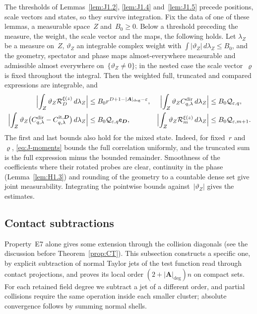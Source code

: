 \begin{remark}\label{lem:J1.3}\label{lem:J1.6}
The thresholds of Lemmas~\ref{lem:J1.2}, \ref{lem:J1.4} and~\ref{lem:J1.5} precede positions, scale vectors and states, so they survive integration. Fix the data of one of these lemmas, a measurable space~$Z$ and~$B_0\ge0$. Below a threshold preceding the measure, the weight, the scale vector and the maps, the following holds. Let $\lambda_Z$ be a measure on~$Z$, $\vartheta_Z$ an integrable complex weight with $\int|\vartheta_Z|\,d\lambda_Z\le B_0$, and the geometry, spectator and phase maps almost-everywhere measurable and admissible almost everywhere on~$\{\vartheta_Z\ne0\}$; in the nested case the scale vector~$\varrho$ is fixed throughout the integral. Then the weighted full, truncated and compared expressions are integrable, and
\begin{align*}
\Bigl|\int_Z\vartheta_Z\mathcal R_D^{\xi(z)}\,d\lambda_Z\Bigr|&\le B_0r^{D+1-|\boldsymbol A|_{\deg}-\varepsilon},&
\Bigl|\int_Z\vartheta_ZC^{\rm dir}_{q,\lambda}\,d\lambda_Z\Bigr|&\le B_0\mathcal Q_{\varepsilon,q},\\
\Bigl|\int_Z\vartheta_Z\bigl(C^{\rm dir}_{q,\lambda}-C^{\rm it,\boldsymbol D}_{q,\lambda}\bigr)\,d\lambda_Z\Bigr|&\le B_0\mathcal Q_{\varepsilon,q}\mathsf e_{\boldsymbol D},&
\Bigl|\int_Z\vartheta_Z\mathcal R_m^{\xi(z)}\,d\lambda_Z\Bigr|&\le B_0\mathcal Q_{\varepsilon,m+1}.
\end{align*}
The first and last bounds also hold for the mixed state. Indeed, for fixed~$r$ and~$\varrho$, \eqref{eq:J-moments} bounds the full correlation uniformly, and the truncated sum is the full expression minus the bounded remainder. Smoothness of the coefficients where their rotated probes are clear, continuity in the phase (Lemma~\ref{lem:H1.3}) and rounding of the geometry to a countable dense set give joint measurability. Integrating the pointwise bounds against~$|\vartheta_Z|$ gives the estimates.
\end{remark}

\subsection{Contact subtractions}\label{sec:partII-J.2}

Property~E7 alone gives some extension through the collision diagonals (see the discussion before Theorem~\ref{prop:CT}). This subsection constructs a specific one, by explicit subtraction of normal Taylor jets of the test function read through contact projections, and proves its local order $(2+|\boldsymbol A|_{\deg})n$ on compact sets. For each retained field degree we subtract a jet of a different order, and partial collisions require the same operation inside each smaller cluster; absolute convergence follows by summing normal shells.

